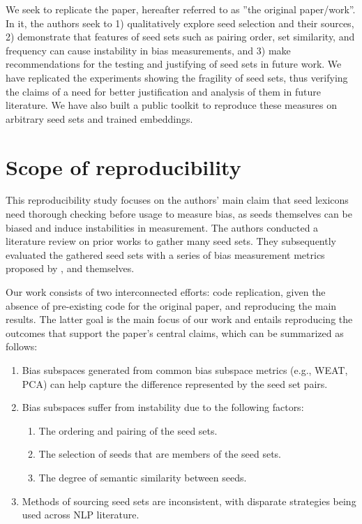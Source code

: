 We seek to replicate the \citet{antoniak-mimno-2021-bad} paper, hereafter referred to as ''the original paper/work''. In it, the authors seek to 1) qualitatively explore seed selection and their sources, 2) demonstrate that features of seed sets such as pairing order, set similarity, and frequency can cause instability in bias measurements, and 3) make recommendations for the testing and justifying of seed sets in future work. We have replicated the experiments showing the fragility of seed sets, thus verifying the claims of a need for better justification and analysis of them in future literature. We have also built a public toolkit to reproduce these measures on arbitrary seed sets and trained embeddings.

\section{Scope of reproducibility} \label{sec:claims}
This reproducibility study focuses on the authors' main claim that seed lexicons need thorough checking before usage to measure bias, as seeds themselves can be biased and induce instabilities in measurement. The authors conducted a literature review on prior works to gather many seed sets. They subsequently evaluated the gathered seed sets with a series of bias measurement metrics proposed by \citet{bolukbasi_man_2016, caliskan_semantics_2017}, and themselves.

Our work consists of two interconnected efforts: code replication, given the absence of pre-existing code for the original paper, and reproducing the main results. The latter goal is the main focus of our work and entails reproducing the outcomes that support the paper's central claims, which can be summarized as follows:

\begin{enumerate}
	\item Bias subspaces generated from common bias subspace metrics (e.g., WEAT, PCA) can help capture the difference represented by the seed set pairs.\label{claim:subspace}
	\item Bias subspaces suffer from instability due to the following factors:
	      \begin{enumerate}\label{claim:instability}
		      \item The ordering and pairing of the seed sets.\label{claim:instability:ordering}
		      \item The selection of seeds that are members of the seed sets.\label{claim:instability:choice}
		      \item The degree of semantic similarity between seeds. \label{claim:instability:semantic}
	      \end{enumerate}
	\item Methods of sourcing seed sets are inconsistent, with disparate strategies being used across NLP literature. \label{claim:sources}
\end{enumerate}

